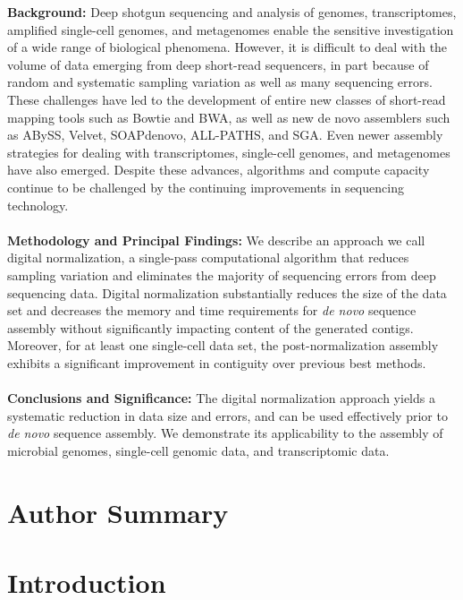 \documentclass[10pt,draft]{article}
\begin{document}
{\bf Background:} Deep shotgun sequencing and analysis of genomes,
transcriptomes, amplified single-cell genomes, and metagenomes enable
the sensitive investigation of a wide range of biological
phenomena. However, it is difficult to deal with the volume of data
emerging from deep short-read sequencers, in part because of random
and systematic sampling variation as well as many sequencing errors.
These challenges have led to the development of entire new classes of
short-read mapping tools such as Bowtie and BWA, as well as new de
novo assemblers such as ABySS, Velvet, SOAPdenovo, ALL-PATHS, and SGA.
Even newer assembly strategies for dealing with transcriptomes,
single-cell genomes, and metagenomes have also emerged.  Despite these
advances, algorithms and compute capacity continue to be challenged by
the continuing improvements in sequencing technology.
\\
\\
{\bf Methodology and Principal Findings:} We describe an approach we call
digital normalization, a single-pass computational algorithm that
reduces sampling variation and eliminates the majority of sequencing
errors from deep sequencing data. Digital normalization substantially
reduces the size of the data set and decreases the memory and time
requirements for {\em de novo} sequence assembly without significantly
impacting content of the generated contigs.  Moreover, for at least
one single-cell data set, the post-normalization assembly exhibits a significant improvement in contiguity over previous best methods.
\\
\\
{\bf Conclusions and Significance:} The digital normalization approach
yields a systematic reduction in data size and errors, and can be used
effectively prior to {\em de novo} sequence assembly.  We demonstrate its
applicability to the assembly of microbial genomes, single-cell
genomic data, and transcriptomic data.

\section*{Author Summary}

\section*{Introduction}
\end{document}
